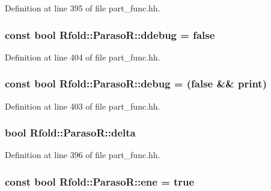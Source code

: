 Definition at line 395 of file part\+\_\+func.\+hh.

\hypertarget{class_rfold_1_1_paraso_r_ae9b7970e1a048776c3ae5ca788f7d760}{
\subsubsection[{ddebug}]{\setlength{\rightskip}{0pt plus 5cm}const bool Rfold\+::\+Paraso\+R\+::ddebug = false\hspace{0.3cm}{\ttfamily [static]}}}\label{class_rfold_1_1_paraso_r_ae9b7970e1a048776c3ae5ca788f7d760}


Definition at line 404 of file part\+\_\+func.\+hh.

\hypertarget{class_rfold_1_1_paraso_r_a2858329db34fcaaa334abbfcea96c01d}{
\subsubsection[{debug}]{\setlength{\rightskip}{0pt plus 5cm}const bool Rfold\+::\+Paraso\+R\+::debug = (false \&\& {\bf print})\hspace{0.3cm}{\ttfamily [static]}}}\label{class_rfold_1_1_paraso_r_a2858329db34fcaaa334abbfcea96c01d}


Definition at line 403 of file part\+\_\+func.\+hh.

\hypertarget{class_rfold_1_1_paraso_r_ac0a808250ee05c1f56b5be32d867f11e}{
\subsubsection[{delta}]{\setlength{\rightskip}{0pt plus 5cm}bool Rfold\+::\+Paraso\+R\+::delta}}\label{class_rfold_1_1_paraso_r_ac0a808250ee05c1f56b5be32d867f11e}


Definition at line 396 of file part\+\_\+func.\+hh.

\hypertarget{class_rfold_1_1_paraso_r_a6e98b41eab558c42df86f5ff7469e7cc}{
\subsubsection[{ene}]{\setlength{\rightskip}{0pt plus 5cm}const bool Rfold\+::\+Paraso\+R\+::ene = true\hspace{0.3cm}{\ttfamily [static]}}}\label{class_rfold_1_1_paraso_r_a6e98b41eab558c42df86f5ff7469e7cc}


